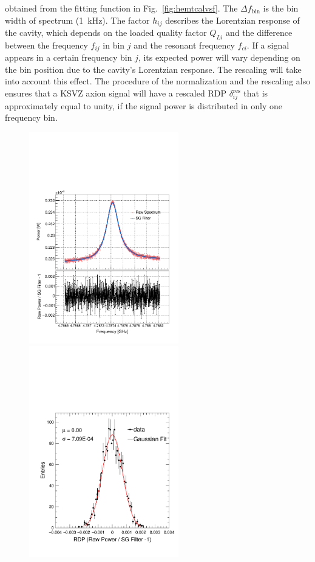 obtained from the fitting function in Fig.~\ref{fig:hemtcalvsf}. 
The $\Delta f_\text{bin}$ is the bin width of spectrum (1~kHz). 
The factor $h_{ij}$ describes the Lorentzian response of the cavity, 
which depends on the loaded quality factor $Q_{Li}$ and the 
difference between the frequency $f_{ij}$ in bin $j$ and the resonant 
frequency $f_{ci}$. 
%
If a signal appears in a certain frequency bin $j$, its expected power 
will vary depending on the bin position due to the cavity's 
Lorentzian response. The rescaling will take into account this effect. 
The procedure of the normalization and the rescaling also ensures that a 
KSVZ axion signal will have a rescaled RDP $\delta_{ij}^\text{res}$ 
that is approximately equal to unity, if the signal power is distributed 
in only one frequency bin. 

\begin{figure} [htbp]
  \centering
  \includegraphics[width=6.5cm]{figures/RawPower_SGPower_Ratio_vs_Freq_Step_0100.pdf}
  \includegraphics[width=6.5cm]{figures/Histogram_RawPower_SGPower_Ratio_Step_0100.pdf}

\end{figure}
